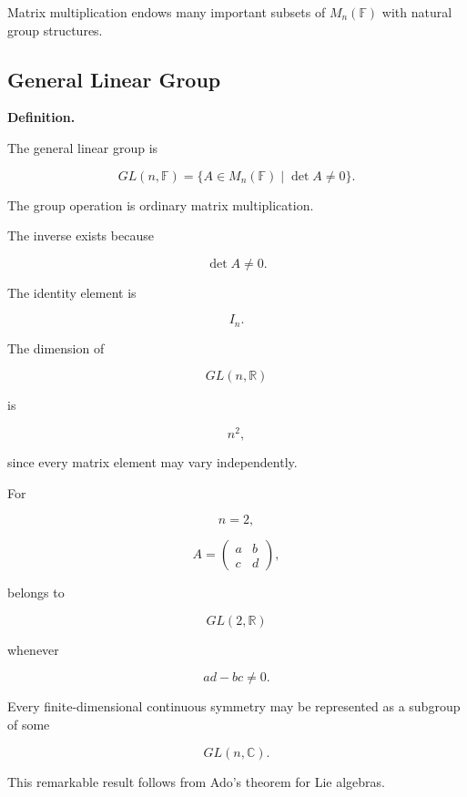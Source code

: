 Matrix multiplication endows many important subsets of
\(M_n(\mathbb F)\) with natural group structures.


\subsection{General Linear Group}

\textbf{Definition.}

The general linear group is

\[
GL(n,\mathbb F)
=
\{
A\in M_n(\mathbb F)
\;|\;
\det A\neq0
\}.
\]

The group operation is ordinary matrix multiplication.

The inverse exists because

\[
\det A\neq0.
\]

The identity element is

\[
I_n.
\]

The dimension of

\[
GL(n,\mathbb R)
\]

is

\[
n^2,
\]

since every matrix element may vary independently.


\begin{example}

For

\[
n=2,
\]

\[
A
=
\begin{pmatrix}
a&b\\
c&d
\end{pmatrix},
\]

belongs to

\[
GL(2,\mathbb R)
\]

whenever

\[
ad-bc\neq0.
\]

\end{example}


\begin{remark}

Every finite-dimensional continuous symmetry may be represented as a
subgroup of some

\[
GL(n,\mathbb C).
\]

This remarkable result follows from Ado's theorem for Lie algebras.

\end{remark}

